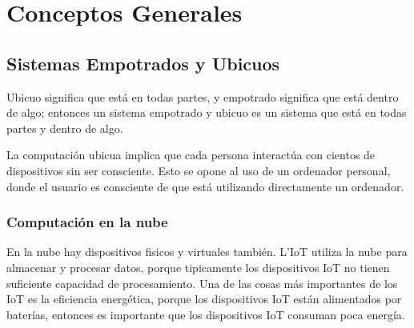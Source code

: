 \chapter{Conceptos Generales}

\section{Sistemas Empotrados y Ubicuos}
Ubicuo significa que está en todas partes, y empotrado significa que está dentro de algo; entonces un sistema empotrado y ubicuo es un sistema que está en todas partes y dentro de algo.

La computación ubicua implica que cada persona interactúa con cientos de dispositivos sin ser consciente. Esto se opone al uso de un ordenador personal, donde el usuario es consciente de que está utilizando directamente un ordenador.

\subsection{Computación en la nube}
En la nube hay dispositivos fisicos y virtuales también. L'IoT utiliza la nube para almacenar y procesar datos, porque tipicamente los dispositivos IoT no tienen suficiente capacidad de procesamiento.
Una de las cosas más importantes de los IoT es la eficiencia energética, porque los dispositivos IoT están alimentados por baterías, entonces es importante que los dispositivos IoT consuman poca energía.